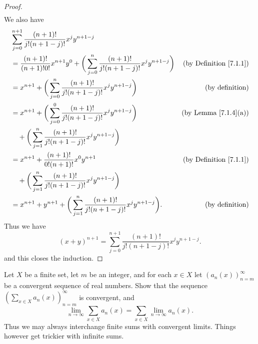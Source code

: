 \begin{proof}
\begin{align*}
    \end{align*}
    We also have
    \begin{align*}
         & \sum_{j = 0}^{n + 1} \frac{(n + 1)!}{j!(n + 1 - j)!} x^j y^{n + 1 - j}                                                                                           \\
         & = \frac{(n + 1)!}{(n + 1)! 0!} x^{n + 1} y^0 + \bigg(\sum_{j = 0}^n \frac{(n + 1)!}{j!(n + 1 - j)!} x^j y^{n + 1 - j}\bigg) & \text{(by Definition \ref{7.1.1})} \\
         & = x^{n + 1} + \bigg(\sum_{j = 0}^n \frac{(n + 1)!}{j!(n + 1 - j)!} x^j y^{n + 1 - j}\bigg)                                  & \text{(by definition)}             \\
         & = x^{n + 1} + \bigg(\sum_{j = 0}^0 \frac{(n + 1)!}{j!(n + 1 - j)!} x^j y^{n + 1 - j}\bigg)                                  & \text{(by Lemma \ref{7.1.4}(a))}   \\
         & \quad + \bigg(\sum_{j = 1}^n \frac{(n + 1)!}{j!(n + 1 - j)!} x^j y^{n + 1 - j}\bigg)                                                                             \\
         & = x^{n + 1} + \frac{(n + 1)!}{0! (n + 1)!} x^0 y^{n + 1}                                                                    & \text{(by Definition \ref{7.1.1})} \\
         & \quad + \bigg(\sum_{j = 1}^n \frac{(n + 1)!}{j!(n + 1 - j)!} x^j y^{n + 1 - j}\bigg)                                                                             \\
         & = x^{n + 1} + y^{n + 1} + \bigg(\sum_{j = 1}^n \frac{(n + 1)!}{j!(n + 1 - j)!} x^j y^{n + 1 - j}\bigg).                     & \text{(by definition)}
    \end{align*}
    Thus we have
    \[
        (x + y)^{n + 1} = \sum_{j = 0}^{n + 1} \frac{(n + 1)!}{j!(n + 1 - j)!} x^j y^{n + 1 - j}.
    \]
    and this closes the induction.
\end{proof}

\begin{exercise}\label{ex 7.1.5}
    Let \(X\) be a finite set, let \(m\) be an integer, and for each \(x \in X\) let \((a_n(x))_{n = m}^\infty\) be a convergent sequence of real numbers.
    Show that the sequence \((\sum_{x \in X} a_n(x))_{n = m}^\infty\) is convergent, and
    \[
        \lim_{n \to \infty} \sum_{x \in X} a_n(x) = \sum_{x \in X} \lim_{n \to \infty} a_n(x).
    \]
    Thus we may always interchange finite sums with convergent limits.
    Things however get trickier with infinite sums.
\end{exercise}

